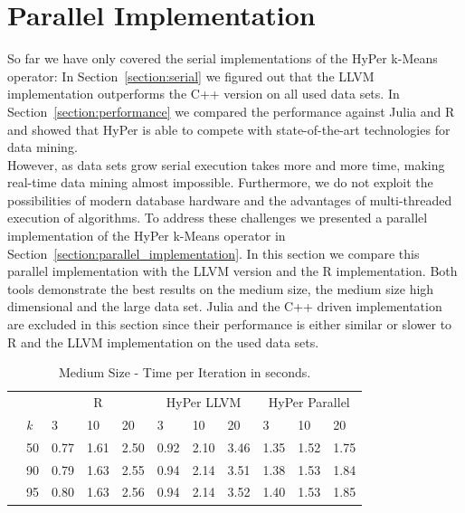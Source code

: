 \section{Parallel Implementation}\label{section:parallel}


So far we have only covered the serial implementations of the HyPer k-Means operator: In Section~\ref{section:serial}  we figured out that the LLVM implementation outperforms the C++ version on all used data sets. In Section~\ref{section:performance} we compared the performance against Julia and R and showed that HyPer is able to compete with state-of-the-art technologies for data mining.
\\
However, as data sets grow serial execution takes more and more time, making real-time data mining almost impossible. Furthermore, we do not exploit the possibilities of modern database hardware and the advantages of multi-threaded execution of algorithms. To address these challenges we presented a parallel implementation of the HyPer k-Means operator in Section~\ref{section:parallel_implementation}. In this section we compare this parallel implementation with the LLVM version and the R implementation. Both tools demonstrate the best results on the medium size, the medium size high dimensional and the large data set. Julia and the C++ driven implementation are excluded in this section since their performance is either similar or slower to R and the LLVM implementation on the used data sets.

\begin{table}[htsb]
  \caption[Medium Size - Time per Iteration]{Medium Size - Time per Iteration in seconds.}
  \label{tab:medium_final}
  \centering
  \begin{tabular}{l l l ll |l l l |l l l }
    \toprule
      && \multicolumn{3}{c}{R} & \multicolumn{3}{c}{HyPer LLVM} & \multicolumn{3}{c}{HyPer Parallel}  \\
      &\emph{k} & 3 & 10 & 20 & 3 & 10 & 20 & 3 & 10 & 20 \\
    \midrule
      \parbox[t]{2mm}{} &50  & 0.77 & 1.61 & 2.50 & 0.92 & 2.10 & 3.46 & 1.35 & 1.52 & 1.75 \\
      &90  & 0.79 & 1.63 & 2.55 & 0.94 & 2.14 & 3.51 & 1.38 & 1.53 & 1.84 \\
      &95  & 0.80 & 1.63 & 2.56 & 0.94 & 2.14 & 3.52 & 1.40 & 1.53 & 1.85 \\
    \bottomrule
  \end{tabular}
\end{table}

